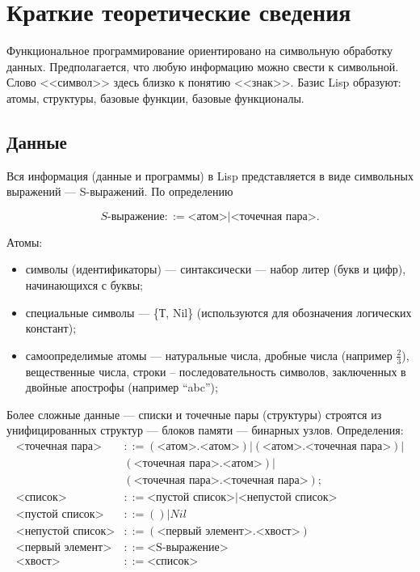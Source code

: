\chapter{Краткие теоретические сведения}
Функциональное программирование ориентировано на символьную обработку данных. Предполагается, что любую информацию можно свести к символьной. Слово <<символ>> здесь близко к понятию <<знак>>. Базис Lisp образуют: атомы, структуры, базовые функции, базовые функционалы.

\section{Данные}
Вся информация (данные и программы) в Lisp представляется в виде символьных выражений --- S-выражений. По определению

\begin{equation}
	S\text{-выражение} ::= \text{<атом>} | \text{<точечная пара>}.
\end{equation}

Атомы:
\begin{itemize}
	\item символы (идентификаторы) --- синтаксически --- набор литер (букв и цифр), начинающихся с буквы;
	\item специальные символы --- \{Т, Nil\} (используются для обозначения логических констант);
	\item самоопределимые атомы --- натуральные числа, дробные числа (например $\frac{2}{3}$), вещественные числа, строки – последовательность
	символов, заключенных в двойные апострофы (например “abc”);
\end{itemize}

Более сложные данные --- списки и точечные пары (структуры) строятся из
унифицированных структур --- блоков памяти --- бинарных узлов.
Определения:
\begin{align*}
	\text{<точечная пара>} &::= (\text{<атом>.<атом>}) | (\text{<атом>.<точечная пара>}) | \\
	&(\text{<точечная пара>.<атом>}) | \\
	&(\text{<точечная пара>.<точечная пара>}); \\
	\text{<список>} &::= \text{<пустой список>} | \text{<непустой список>} \\
	\text{<пустой список>} &::= ( ) | Nil \\
	\text{<непустой список>} &::= (\text{<первый элемент>.<хвост>}) \\
	\text{<первый элемент>} &::= \text{<S-выражение>} \\
	\text{<хвост>} &::= \text{<список>}
\end{align*}

